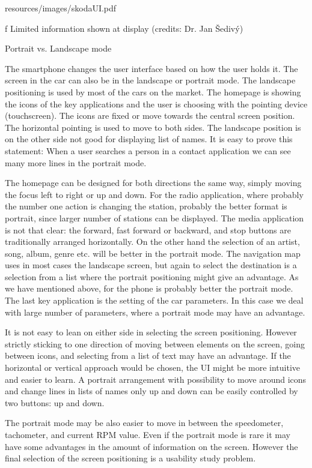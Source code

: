 \midinsert {}
\picw=10cm \cinspic resources/images/skodaUI.pdf 
\caption/f Limited information shown at display (credits: Dr. Jan Šedivý)
\endinsert

\secc Portrait vs. Landscape mode

The smartphone changes the user interface based on how the user holds it. The screen in the car can also be in the landscape or portrait mode. The landscape positioning is used by most of the cars on the market. The homepage is showing the icons of the key applications and the user is choosing with the pointing device (touchscreen). The icons are fixed or move towards the central screen position. The horizontal pointing is used to move to both sides. The landscape position is on the other side not good for displaying list of names. It is easy to prove this statement: When a user searches a person in a contact application we can see many more lines in the portrait mode. 

The homepage can be designed for both directions the same way, simply moving the focus left to right or up and down. For the radio application, where probably the number one action is changing the station, probably the better format is portrait, since larger number of stations can be displayed. The media application is not that clear: the forward, fast forward or backward, and stop buttons are traditionally arranged horizontally. On the other hand the selection of an artist, song, album, genre etc. will be better in the portrait mode. The navigation map uses in most cases the landscape screen, but again to select the destination is a selection from a list where the portrait positioning might give an advantage. As we have mentioned above, for the phone is probably better the portrait mode. The last key application is the setting of the car parameters. In this case we deal with large number of parameters, where a portrait mode may have an advantage.

It is not easy to lean on either side in selecting the screen positioning. However strictly sticking to one direction of moving between elements on the screen, going between icons, and selecting from a list of text may have an advantage. If the horizontal or vertical approach would be chosen, the UI might be more intuitive and easier to learn. A portrait arrangement with possibility to move around icons and change lines in lists of names only up and down can be easily controlled by two buttons: up and down. 

The portrait mode may be also easier to move in between the speedometer, tachometer, and current RPM value. Even if the portrait mode is rare it may have some advantages in the amount of information on the screen. However the final selection of the screen positioning is a usability study problem. 

